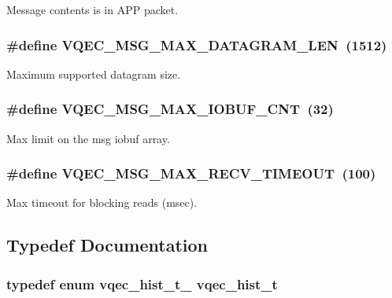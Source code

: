 Message contents is in APP packet. 

\subsubsection{\setlength{\rightskip}{0pt plus 5cm}\#define VQEC\_\-MSG\_\-MAX\_\-DATAGRAM\_\-LEN~(1512)}\label{group__gdefs_g90ffe1a2b38fcf733db0dfa44aad2a3d}


Maximum supported datagram size. 

\subsubsection{\setlength{\rightskip}{0pt plus 5cm}\#define VQEC\_\-MSG\_\-MAX\_\-IOBUF\_\-CNT~(32)}\label{group__gdefs_g8da8a2d5f6e264cf620da7db0738415c}


Max limit on the msg iobuf array. 

\subsubsection{\setlength{\rightskip}{0pt plus 5cm}\#define VQEC\_\-MSG\_\-MAX\_\-RECV\_\-TIMEOUT~(100)}\label{group__gdefs_g22e75aef69084d0bfd2a631e97d66317}


Max timeout for blocking reads (msec). 



\subsection{Typedef Documentation}
\subsubsection{\setlength{\rightskip}{0pt plus 5cm}typedef enum \bf{vqec\_\-hist\_\-t\_\-}  \bf{vqec\_\-hist\_\-t}}\label{group__gdefs_g828ca8986f370100b1c5fca828bc8540}





